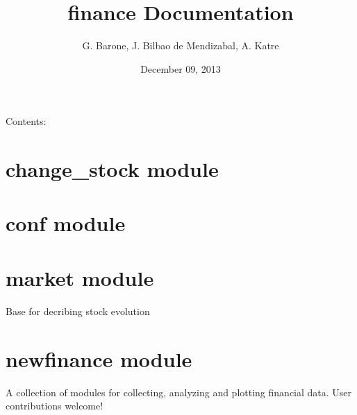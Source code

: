\documentclass[letterpaper,10pt,english]{sphinxmanual}
\title{finance Documentation}
\date{December 09, 2013}
\author{G. Barone, J. Bilbao de Mendizabal, A. Katre}
\begin{document}
\maketitle
\tableofcontents
{}\label{index::doc}


Contents:


\chapter{change\_stock module}
\label{change_stock::doc}\label{change_stock:welcome-to-finance-s-documentation}\label{change_stock:module-change_stock}\label{change_stock:change-stock-module}

\chapter{conf module}
\label{conf:module-conf}\label{conf:conf-module}\label{conf::doc}

\chapter{market module}
\label{market:module-market}\label{market::doc}\label{market:market-module}

\begin{fulllineitems}
\label{market:market.market}
Base for decribing stock evolution

\begin{fulllineitems}
\label{market:market.market.m_cap}
\end{fulllineitems}


\begin{fulllineitems}
\label{market:market.market.m_time}
\end{fulllineitems}


\end{fulllineitems}



\chapter{newfinance module}
\label{newfinance:module-newfinance}\label{newfinance:newfinance-module}\label{newfinance::doc}
A collection of modules for collecting, analyzing and plotting
financial data.   User contributions welcome!
\end{document}

